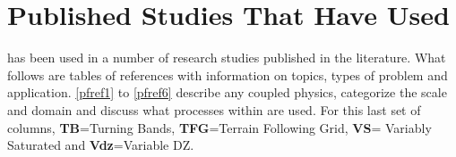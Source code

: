 \section{Published Studies That Have Used \parflow{}}
\label{lit_table}

\parflow{} has been used in a number of research studies published in the literature. 
What follows are tables of \parflow{} references with information on topics, types of problem and
application.  \ref{pfref1} to \ref{pfref6} describe any coupled physics, 
categorize the scale and domain and discuss what processes within \parflow{} are used.  For this last
set of columns, {\bf TB}=Turning Bands, {\bf TFG}=Terrain Following Grid, {\bf VS}= Variably Saturated
and {\bf Vdz}=Variable DZ.\\
\newpage


